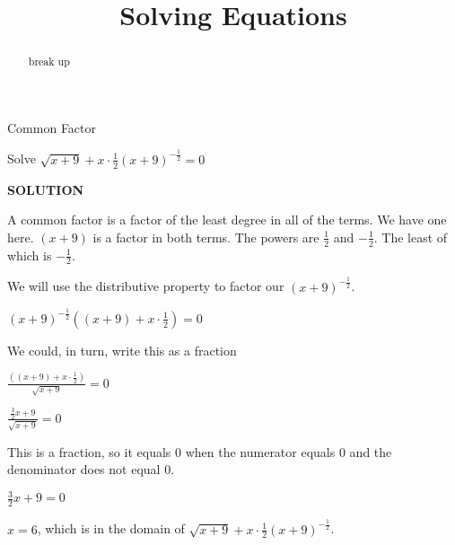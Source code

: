 \documentclass{ximera}
\title{Solving Equations}
\begin{document}
\begin{abstract}
break up
\end{abstract}
\maketitle





\begin{example}  Common Factor


Solve $\sqrt{x+9} + x \cdot \frac{1}{2} (x+9)^{-\tfrac{1}{2}} = 0$



\textbf{\textcolor{purple!50!blue!90!black}{SOLUTION}}



A common factor is a factor of the least degree in all of the terms.  We have one here. $(x+9)$ is a factor in both terms.  The powers are $\frac{1}{2}$ and $-\frac{1}{2}$. The least of which is $-\frac{1}{2}$.

We will use the distributive property to factor our $(x+9)^{-\tfrac{1}{2}}$.


$(x+9)^{-\tfrac{1}{2}} \left((x+9) + x \cdot \frac{1}{2}\right)  = 0$


We could, in turn, write this as a fraction


$\frac{\left((x+9) + x \cdot \frac{1}{2}\right)}{\sqrt{x+9}} = 0$


$\frac{ \frac{3}{2} x + 9}{\sqrt{x+9}} = 0$



This is a fraction, so it equals $0$ when the numerator equals $0$ and the denominator does not equal $0$.


$\frac{3}{2} x + 9 = 0$



$x = 6$, which is in the domain of $\sqrt{x+9} + x \cdot \frac{1}{2} (x+9)^{-\tfrac{1}{2}}$.

\end{example}
\end{document}
